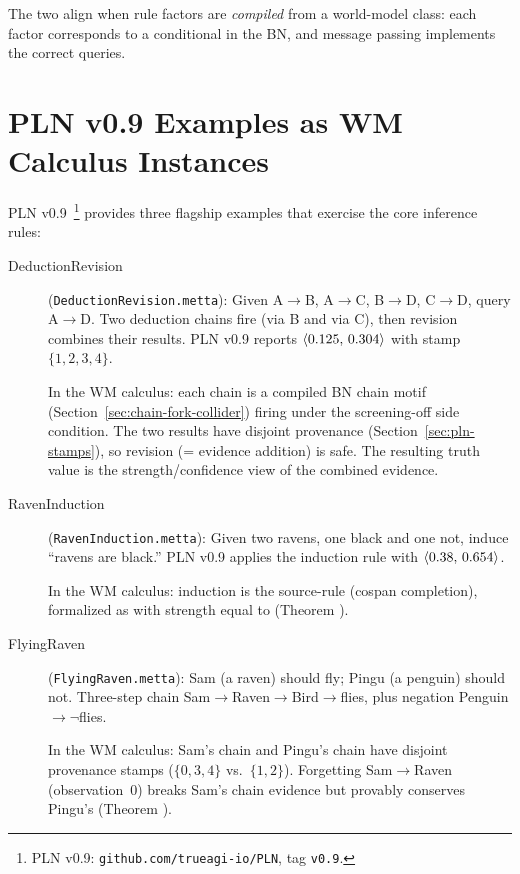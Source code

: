 \documentclass[11pt,openany]{report}
\begin{document}
The two align when rule factors are \emph{compiled} from a world-model
class: each factor corresponds to a conditional in the BN, and message
passing implements the correct queries.

\section{PLN v0.9 Examples as WM Calculus Instances}
\label{sec:pln-v09-examples}

PLN v0.9~\cite{goertzel2009pln}\footnote{PLN v0.9: \texttt{github.com/trueagi-io/PLN}, tag \texttt{v0.9}.}
provides three flagship examples that exercise the core inference rules:

\begin{description}
\item[DeductionRevision] (\texttt{DeductionRevision.metta}):
  Given A$\to$B, A$\to$C, B$\to$D, C$\to$D, query A$\to$D.
  Two deduction chains fire (via B and via C), then revision
  combines their results.  PLN v0.9 reports
  $\langle 0.125,\, 0.304 \rangle$ with stamp $\{1,2,3,4\}$.

  In the WM calculus: each chain is a compiled BN chain motif
  (Section~\ref{sec:chain-fork-collider}) firing under the
  screening-off side condition.  The two results have disjoint
  provenance (Section~\ref{sec:pln-stamps}), so revision
  (= evidence addition) is safe.  The resulting truth value
  is the strength/confidence view of the combined evidence.

\item[RavenInduction] (\texttt{RavenInduction.metta}):
  Given two ravens, one black and one not, induce ``ravens are black.''
  PLN v0.9 applies the induction rule with $\langle 0.38,\, 0.654 \rangle$.

  In the WM calculus: induction is the source-rule (cospan completion),
  formalized as  with strength equal to
  (Theorem ).

\item[FlyingRaven] (\texttt{FlyingRaven.metta}):
  Sam (a raven) should fly; Pingu (a penguin) should not.
  Three-step chain Sam$\to$Raven$\to$Bird$\to$flies, plus
  negation Penguin$\to\lnot$flies.

  In the WM calculus: Sam's chain and Pingu's chain have
  disjoint provenance stamps ($\{0,3,4\}$ vs.\ $\{1,2\}$).
  Forgetting Sam$\to$Raven (observation~0) breaks Sam's
  chain evidence but provably conserves Pingu's
  (Theorem ).
\end{description}
\end{document}
